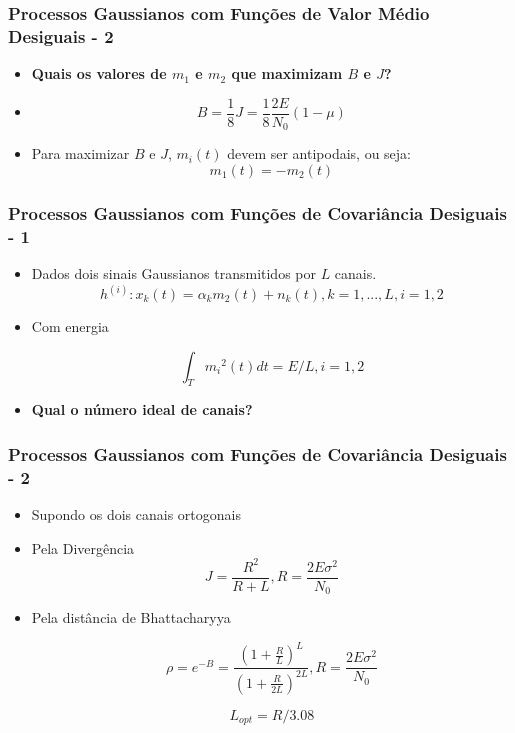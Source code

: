 \documentclass{beamer}
\begin{document}
\begin{frame}

	\frametitle{Processos Gaussianos com Funções de Valor Médio Desiguais - 2}
	
	\begin{itemize}	
	
		\item \textbf{Quais os valores de $m_1$ e $m_2$ que maximizam $B$ e $J$?}
		
		\item[] $$ B = \frac{1}{8}J=\frac{1}{8}\frac{2E}{N_0}(1-\mu) $$
		\item Para maximizar $B$ e $J$, $m_i(t)$ devem ser antipodais, ou seja: $$ m_1(t) = -m_2(t)$$
	\end{itemize}
	

	
\end{frame}


\begin{frame}
    \frametitle{Processos Gaussianos com Funções de Covariância Desiguais - 1}
    
    \begin{itemize}
    
    	\item Dados dois sinais Gaussianos transmitidos por $L$ canais. 
		$$ h^{(i)}:x_k(t)  = \alpha_km_2(t) + n_k(t), k = 1,...,L, i = 1,2 $$
		
		\item[] Com energia
		
		$$ \int_{T}^{} {m_i}^2(t)dt = E/L, i=1,2 $$
		
    	\item[] \textbf{Qual o número ideal de canais?}
    \end{itemize}
    
\end{frame}


\begin{frame}
    \frametitle{Processos Gaussianos com Funções de Covariância Desiguais - 2}
    
    \begin{itemize}
    
    	\item[] Supondo os dois canais ortogonais
	
	
		\item Pela Divergência
		$$ J = \frac{R^2}{R+L}, R = \frac{2E\sigma^2}{N_0} $$
	
		\item Pela distância de Bhattacharyya
	
		$$ \rho = e^{-B} = \frac{{(1+\frac{R}{L})}^L}{{(1+\frac{R}{2L})}^{2L}}, R = \frac{2E\sigma^2}{N_0}$$
	
		$$ L_{opt} = R/3.08 $$
    \end{itemize}
    
\end{frame}
\end{document}
